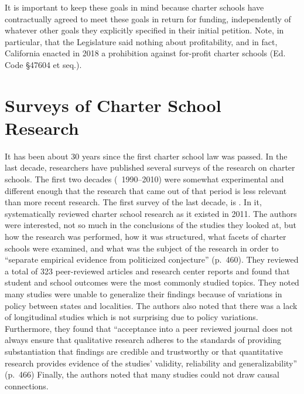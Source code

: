 It is important to keep these goals in mind because charter schools have contractually agreed to meet these goals in return for funding, independently of whatever other goals they explicitly specified in their initial petition. Note, in particular, that the Legislature said nothing about profitability, and in fact, California enacted in 2018 a prohibition against for-profit charter schools (Ed. Code §47604 et seq.).

\section{Surveys of Charter School Research}\label{sec:charter-surveys}\indent

It has been about 30 years since the first charter school law was passed. In the last decade, researchers have published several surveys of the research on charter schools. The first two decades (~1990–2010) were somewhat experimental and different enough that the research that came out of that period is less relevant than more recent research. The first survey of the last decade, is .  In it, \textcite{Smith.etal2011} systematically reviewed charter school research as it existed in 2011. The authors were interested, not so much in the conclusions of the studies they looked at, but how the research was performed, how it was structured, what facets of charter schools were examined, and what was the subject of the research in order to ``separate empirical evidence from politicized conjecture'' (p.~460). They reviewed a total of 323 peer-reviewed articles and research center reports and found that student and school outcomes were the most commonly studied topics. They noted many studies were unable to generalize their findings because of variations in policy between states and localities. The authors also noted that there was a lack of longitudinal studies which is not surprising due to policy variations. Furthermore, they found that ``acceptance into a peer reviewed journal does not always ensure that qualitative research adheres to the standards of providing substantiation that findings are credible and trustworthy or that quantitative research provides evidence of the studies' validity, reliability and generalizability'' (p.~466) Finally, the authors noted that many studies could not draw causal connections.


